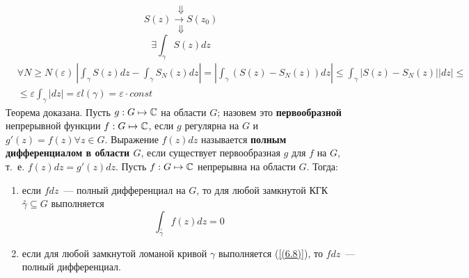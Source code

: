 $$\Downarrow$$
$$S(z) \rightarrow S(z_0)$$
$$\Downarrow$$
$$\exists \int_{\gamma}S(z)dz$$
\begin{align*}
  &\forall N \geq N(\varepsilon) \ \left| \int_{\gamma}S(z)dz - \int_{\gamma}S_N(z)dz\right| = \left| \int_\gamma \left( S(z) - S_N(z) \right)dz\right| \leq \int_\gamma \left| S(z) - S_N(z) \right| \left| dz \right| \leq \\
  & \leq \varepsilon \int_{\gamma} \left| dz \right| = \varepsilon l(\gamma) = \varepsilon \cdot const
\end{align*}
Теорема доказана.
\Def
Пусть $g: G \mapsto \mathbb{C}$ на области $G$; назовем это \textbf{первообразной}
непрерывной функции $f: G \mapsto \mathbb{C}$, если $g$ регулярна на $G$ и $g'(z) =
f(z) \forall z \in G$.
\Def
Выражение $f(z)dz$ называется \textbf{полным дифференциалом в области $G$}, если
существует первообразная $g$ для $f$ на $G$, т.~е. $f(z)dz = g'(z)dz$.
\theorem
Пусть $f:G \mapsto \mathbb{C}$ непрерывна на области $G$. Тогда:
\begin{enumerate}
    \item если $f dz$~--- полный дифференциал на $G$, то для любой замкнутой КГК
    $\overset{\circ}{\gamma} \subseteq G$ выполняется
    \begin{equation} \label{(6.9)}
      \int_{\overset{\circ}{\gamma}} f(z) dz = 0
    \end{equation}
    \item если для любой замкнутой ломаной кривой $\gamma$ выполняется
    (\ref{(6.8)}), то $f dz$~--- полный дифференциал.
\end{enumerate}
\pr ~
\\
